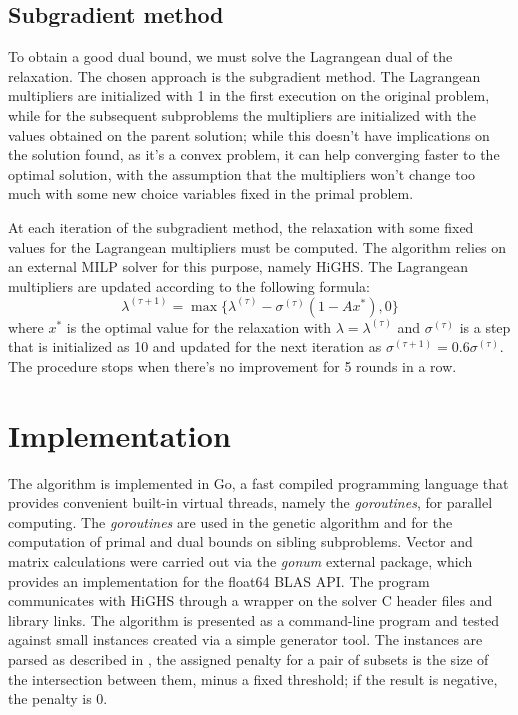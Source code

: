 \documentclass[a4paper]{article}
\begin{document}
\subsection{Subgradient method}
To obtain a good dual bound, we must solve the Lagrangean dual of the relaxation. The chosen approach is the subgradient method. The Lagrangean multipliers are initialized with 1 in the first execution on the original problem, while for the subsequent subproblems the multipliers are initialized with the values obtained on the parent solution; while this doesn't have implications on the solution found, as it's a convex problem, it can help converging faster to the optimal solution, with the assumption that the multipliers won't change too much with some new choice variables fixed in the primal problem.

At each iteration of the subgradient method, the relaxation with some fixed values for the Lagrangean multipliers must be computed. The algorithm relies on an external MILP solver for this purpose, namely HiGHS.
The Lagrangean multipliers are updated according to the following formula:
$$
\lambda^{(\tau+1)}=\max\{\lambda^{(\tau)} - \sigma^{(\tau)}(1 - Ax^*), 0\}
$$
where $x^*$ is the optimal value for the relaxation with $\lambda=\lambda^{(\tau)}$ and $\sigma^{(\tau)}$ is a step that is initialized as 10 and updated for the next iteration as $\sigma^{(\tau+1)}=0.6\sigma^{(\tau)}$.
The procedure stops when there's no improvement for 5 rounds in a row.

\section{Implementation}

The algorithm is implemented in Go, a fast compiled programming language that provides convenient built-in virtual threads, namely the \textit{goroutines}, for parallel computing. The \textit{goroutines} are used in the genetic algorithm and for the computation of primal and dual bounds on sibling subproblems.
Vector and matrix calculations were carried out via the \textit{gonum} external package, which provides an implementation for the float64 BLAS API.
The program communicates with HiGHS through a wrapper on the solver C header files and library links.
The algorithm is presented as a command-line program and tested against small instances created via a simple generator tool.
The instances are parsed as described in \cite{CARRABS2024106620}, the assigned penalty for a pair of subsets is the size of the intersection between them, minus a fixed threshold; if the result is negative, the penalty is 0.
\end{document}
